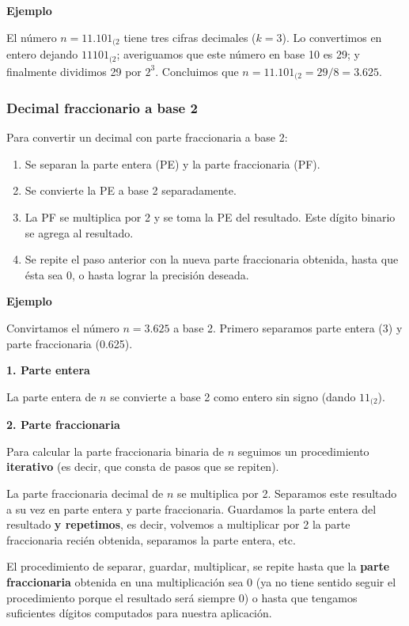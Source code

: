 \documentclass[spanish,A4,]{article}
\begin{document}
\textbf{Ejemplo}

El número $n = 11.101_{(2}$ tiene tres cifras decimales ($k = 3$). Lo
convertimos en entero dejando $11101_{(2}$; averiguamos que este número
en base 10 es 29; y finalmente dividimos 29 por $2^3$. Concluimos que
$n = 11.101_{(2} = 29/8 = 3.625$.

\subsubsection{Decimal fraccionario a base
2}\label{decimal-fraccionario-a-base-2}

Para convertir un decimal con parte fraccionaria a base 2:

\begin{enumerate}
\def\labelenumi{\arabic{enumi}.}
\itemsep1pt\parskip0pt
\item
  Se separan la parte entera (PE) y la parte fraccionaria (PF).
\item
  Se convierte la PE a base 2 separadamente.
\item
  La PF se multiplica por 2 y se toma la PE del resultado. Este dígito
  binario se agrega al resultado.
\item
  Se repite el paso anterior con la nueva parte fraccionaria obtenida,
  hasta que ésta sea 0, o hasta lograr la precisión deseada.
\end{enumerate}

\textbf{Ejemplo}

Convirtamos el número $n = 3.625$ a base 2. Primero separamos parte
entera (3) y parte fraccionaria (0.625).

\textbf{1. Parte entera}

La parte entera de $n$ se convierte a base 2 como entero sin signo
(dando $11_{(2}$).

\textbf{2. Parte fraccionaria}

Para calcular la parte fraccionaria binaria de $n$ seguimos un
procedimiento \textbf{iterativo} (es decir, que consta de pasos que se
repiten).

La parte fraccionaria decimal de $n$ se multiplica por 2. Separamos este
resultado a su vez en parte entera y parte fraccionaria. Guardamos la
parte entera del resultado \textbf{y repetimos}, es decir, volvemos a
multiplicar por 2 la parte fraccionaria recién obtenida, separamos la
parte entera, etc.

El procedimiento de separar, guardar, multiplicar, se repite hasta que
la \textbf{parte fraccionaria} obtenida en una multiplicación sea 0 (ya
no tiene sentido seguir el procedimiento porque el resultado será
siempre 0) o hasta que tengamos suficientes dígitos computados para
nuestra aplicación.
\end{document}
